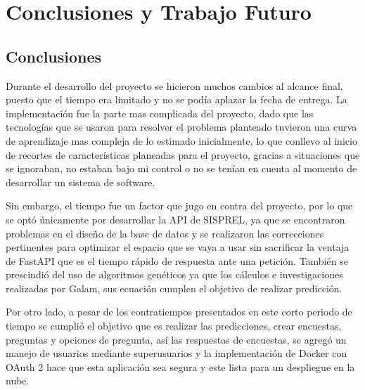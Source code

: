 \chapter{Conclusiones y Trabajo Futuro}

\section{Conclusiones}
Durante el desarrollo del proyecto se hicieron muchos cambios al alcance final, puesto que el tiempo era limitado y no se podía aplazar la fecha de entrega. La implementación fue la parte mas complicada del proyecto, dado que las tecnologías que se usaron para resolver el problema planteado tuvieron una curva de aprendizaje mas compleja de lo estimado inicialmente, lo que conllevo al inicio de recortes de características planeadas para el proyecto, gracias a situaciones que se ignoraban, no estaban bajo mi control o no se tenían en cuenta al momento de desarrollar un sistema de software.

Sin embargo, el tiempo fue un factor que jugo en contra del proyecto, por lo que se optó únicamente por desarrollar la API de SISPREL, ya que se encontraron problemas en el diseño de la base de datos y se realizaron las correcciones pertinentes para optimizar el espacio que se vaya a usar sin sacrificar la ventaja de FastAPI que es el tiempo rápido de respuesta ante una petición. También se prescindió del uso de algoritmos genéticos ya que los cálculos e investigaciones realizadas por Galam, sus ecuación cumplen el objetivo de realizar predicción.

Por otro lado, a pesar de los contratiempos presentados en este corto periodo de tiempo se cumplió el objetivo que es realizar las predicciones, crear encuestas, preguntas y opciones de pregunta, así las respuestas de encuestas, se agregó un manejo de usuarios mediante superusuarios y la implementación de Docker con OAuth 2 hace que esta aplicación sea segura y este lista para un despliegue en la nube.

